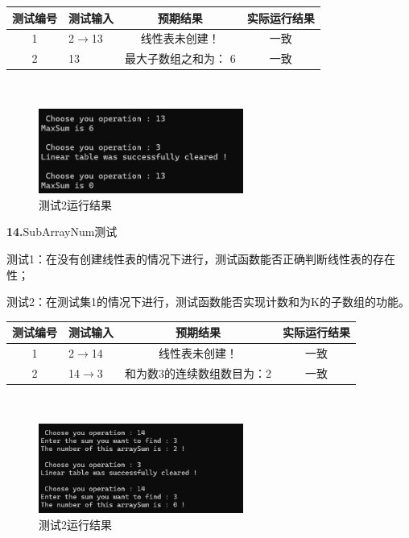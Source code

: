 \documentclass[supercite]{Experimental_Report}
\theoremstyle{definition}
\begin{document}
\vspace{0.5em}

\begin{tabular}{|c|p{2.7cm}|c|c|}
	\hline
	测试编号 & 测试输入 & 预期结果 & 实际运行结果 \\
	\hline
	1 & 2$\rightarrow$13 & 线性表未创建！ & 一致 \\
	\hline
	2 & 13 & 最大子数组之和为： 6& 一致 \\
	\hline
\end{tabular}

~\

 \begin{figure}[H]
 	\centering
 	\includegraphics[width=0.6\textwidth]{images/线性表测试13.png}
 	\caption{测试2运行结果}
 	\label{txlab}
 \end{figure}


\noindent\textbf{14.}SubArrayNum测试
	
测试1：在没有创建线性表的情况下进行，测试函数能否正确判断线性表的存在性；

测试2：在测试集1的情况下进行，测试函数能否实现计数和为K的子数组的功能。

\vspace{0.5em}

\begin{tabular}{|c|p{2.7cm}|c|c|}
	\hline
	测试编号 & 测试输入 & 预期结果 & 实际运行结果 \\
	\hline
	1 & 2$\rightarrow$14 & 线性表未创建！ & 一致 \\
	\hline
	2 & 14$\rightarrow$3 & 和为数3的连续数组数目为：2 & 一致 \\
	\hline
\end{tabular}

~\

 \begin{figure}[H]
 	\centering
 	\includegraphics[width=0.6\textwidth]{images/线性表测试14.png}
 	\caption{测试2运行结果}
 	\label{txlab}
 \end{figure}
\end{document}
